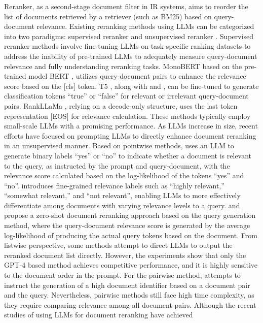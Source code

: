 \documentclass[sigconf,natbib=true,anonymous=false]{acmart}
\begin{document}
Reranker, as a second-stage document filter in IR systems, aims to reorder the list of documents retrieved by a retriever (such as BM25) based on query-document relevance. Existing reranking methods using LLMs can be categorized into two paradigms: supervised reranker and unsupervised reranker \cite{DBLP:journals/corr/abs-2308-07107}. Supervised reranker methods \cite{DBLP:journals/corr/abs-1910-14424, DBLP:conf/sigir/JuYW21, DBLP:journals/corr/abs-2101-05667, DBLP:journals/corr/abs-2310-08319} involve fine-tuning LLMs on task-specific ranking datasets to address the inability of pre-trained LLMs to adequately measure query-document relevance and fully understanding reranking tasks. MonoBERT \cite{DBLP:journals/corr/abs-1910-14424} based on the pre-trained model BERT \cite{DBLP:conf/naacl/DevlinCLT19}, utilizes query-document pairs to enhance the relevance score based on the [cls] token. T5 \cite{DBLP:conf/emnlp/NogueiraJPL20}, along with \cite{DBLP:conf/sigir/JuYW21} and \cite{DBLP:journals/corr/abs-2101-05667}, can be fine-tuned to generate classification tokens “true” or “false” for relevant or irrelevant query-document pairs. RankLLaMa \cite{DBLP:journals/corr/abs-2310-08319}, relying on a decode-only structure, uses the last token representation [EOS] for relevance calculation. These methods typically employ small-scale LLMs with a promising performance. As LLMs increase in size, recent efforts \cite{DBLP:journals/corr/abs-2211-09110, DBLP:journals/corr/abs-2310-14122, DBLP:conf/emnlp/SachanLJAYPZ22, DBLP:conf/emnlp/SachanLJAYPZ22, DBLP:conf/emnlp/Zhuang0KZ23} have focused on prompting LLMs to directly enhance document reranking in an unsupervised manner. Based on pointwise methods, \citet{DBLP:journals/corr/abs-2211-09110} uses an LLM to generate binary labels “yes” or “no” to indicate whether a document is relevant to the query, as instructed by the prompt and query-document, with the relevance score calculated based on the log-likelihood of the tokens “yes” and “no”. \citet{DBLP:journals/corr/abs-2310-14122} introduces fine-grained relevance labels such as “highly relevant,” “somewhat relevant,” and “not relevant”, enabling LLMs to more effectively differentiate among documents with varying relevance levels to a query. \citet{DBLP:conf/emnlp/SachanLJAYPZ22} and \citet{DBLP:conf/emnlp/Zhuang0KZ23} propose a zero-shot document reranking approach based on the query generation method, where the query-document relevance score is generated by the average log-likelihood of producing the actual query tokens based on the document. From listwise perspective, some methods \cite{DBLP:conf/emnlp/0001YMWRCYR23, DBLP:journals/corr/abs-2305-02156, DBLP:journals/corr/abs-2310-07712} attempt to direct LLMs to output the reranked document list directly. However, the experiments show that only the GPT-4 based method achieves competitive performance, and it is highly sensitive to the document order in the prompt. For the pairwise method, \citet{DBLP:journals/corr/abs-2306-17563} attempts to instruct the generation of a high document identifier based on a document pair and the query. Nevertheless, pairwise methods still face high time complexity, as they require comparing relevance among all document pairs. Although the recent studies of using LLMs for document reranking have achieved 
\end{document}
